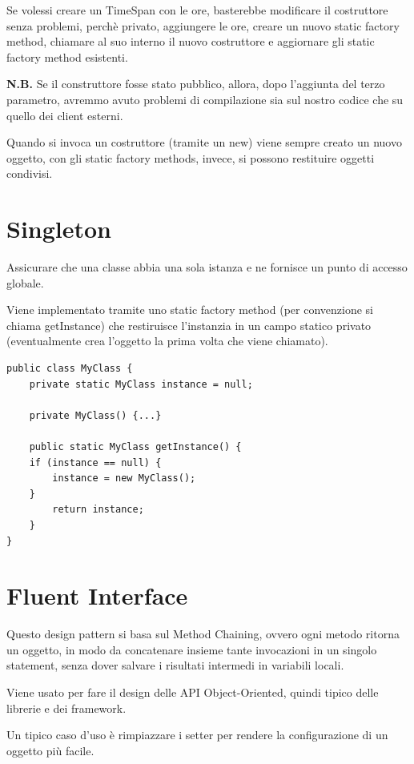 Se volessi creare un TimeSpan con le ore, basterebbe modificare il costruttore senza problemi, perchè privato, aggiungere le ore, creare un nuovo static factory method, 
chiamare al suo interno il nuovo costruttore e aggiornare gli static factory method esistenti.

\medskip
\textbf{N.B.} Se il construttore fosse stato pubblico, allora, dopo l'aggiunta del terzo parametro, avremmo avuto problemi di compilazione sia sul nostro codice che su 
quello dei client esterni.
\medskip

Quando si invoca un costruttore (tramite un new) viene sempre creato un nuovo oggetto, con gli static factory methods, invece, si possono restituire oggetti condivisi.

\section{Singleton}

Assicurare che una classe abbia una sola istanza e ne fornisce un punto di accesso globale.

Viene implementato tramite uno static factory method (per convenzione si chiama getInstance) che restiruisce l'instanzia in un campo statico privato 
(eventualmente crea l'oggetto la prima volta che viene chiamato).

\begin{lstlisting}
public class MyClass {
    private static MyClass instance = null;
    
    private MyClass() {...}

    public static MyClass getInstance() {
    if (instance == null) {
        instance = new MyClass();
    }
        return instance;
    }
}
\end{lstlisting}

\section{Fluent Interface}

Questo design pattern si basa sul Method Chaining, ovvero ogni metodo ritorna un oggetto, in modo da concatenare insieme tante invocazioni in un singolo statement, 
senza dover salvare i risultati intermedi in variabili locali.

Viene usato per fare il design delle API Object-Oriented, quindi tipico delle librerie e dei framework.

Un tipico caso d’uso è rimpiazzare i setter per rendere la configurazione di un oggetto più facile.

